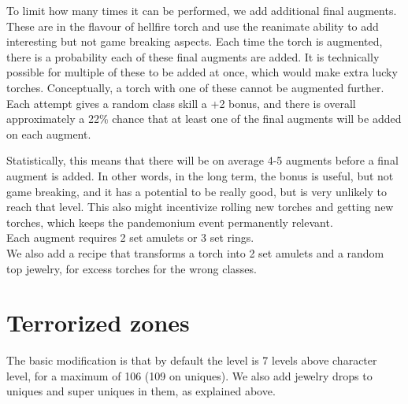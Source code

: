 \documentclass[12pt,a4paper]{article}
\begin{document}
To limit how many times it can be performed, we add additional final augments. These are in the flavour of hellfire torch and use the reanimate ability to add interesting but not game breaking aspects. Each time the torch is augmented, there is a probability each of these final augments are added. It is technically possible for multiple of these to be added at once, which would make extra lucky torches. Conceptually, a torch with one of these cannot be augmented further. Each attempt gives a random class skill a +2 bonus, and there is overall approximately a 22\% chance that at least one of the final augments will be added on each augment.\\

\begin{center}
\end{center}

Statistically, this means that there will be on average 4-5 augments before a final augment is added. In other words, in the long term, the bonus is useful, but not game breaking, and it has a potential to be really good, but is very unlikely to reach that level. This also might incentivize rolling new torches and getting new torches, which keeps the pandemonium event permanently relevant.\\

Each augment requires 2 set amulets or 3 set rings.\\

We also add a recipe that transforms a torch into 2 set amulets and a random top jewelry, for excess torches for the wrong classes.

\section{Terrorized zones}

The basic modification is that by default the level is 7 levels above character level, for a maximum of 106 (109 on uniques). We also add jewelry drops to uniques and super uniques in them, as explained above.\\
\end{document}
